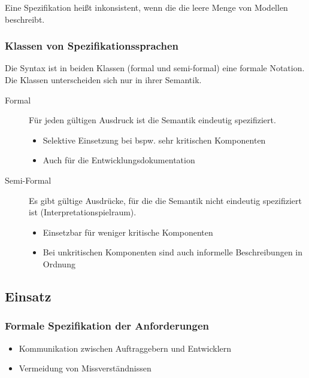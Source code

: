 															Eine Spezifikation heißt inkonsistent, wenn die die leere Menge von Modellen beschreibt.

															\subsubsection{Klassen von Spezifikationssprachen}
																Die Syntax ist in beiden Klassen (formal und semi-formal) eine formale Notation. Die Klassen unterscheiden sich nur in ihrer Semantik.
																\begin{description}
																	\item[Formal] Für jeden gültigen Ausdruck ist die Semantik eindeutig spezifiziert.
																		\begin{itemize}
																			\item Selektive Einsetzung bei bspw. sehr kritischen Komponenten
																			\item Auch für die Entwicklungsdokumentation
																		\end{itemize}
																	\item[Semi-Formal] Es gibt gültige Ausdrücke, für die die Semantik nicht eindeutig spezifiziert ist (Interpretationspielraum).
																		\begin{itemize}
																			\item Einsetzbar für weniger kritische Komponenten
																			\item Bei unkritischen Komponenten sind auch informelle Beschreibungen in Ordnung
																		\end{itemize}
																\end{description}

														\subsection{Einsatz}
															\subsubsection{Formale Spezifikation der Anforderungen}
																\begin{itemize}
																	\item Kommunikation zwischen Auftraggebern und Entwicklern
																	\item Vermeidung von Missverständnissen
																\end{itemize}

